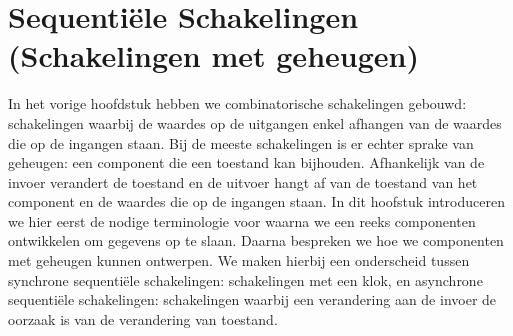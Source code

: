 \chapter{Sequenti\"ele Schakelingen (Schakelingen met geheugen)}
\begin{chapterintro}
In het vorige hoofdstuk hebben we combinatorische schakelingen gebouwd: schakelingen waarbij de waardes op de uitgangen enkel afhangen van de waardes die op de ingangen staan. Bij de meeste schakelingen is er echter sprake van geheugen: een component die een toestand kan bijhouden. Afhankelijk van de invoer verandert de toestand en de uitvoer hangt af van de toestand van het component en de waardes die op de ingangen staan. In dit hoofstuk introduceren we hier eerst de nodige terminologie voor waarna we een reeks componenten ontwikkelen om gegevens op te slaan. Daarna bespreken we hoe we componenten met geheugen kunnen ontwerpen. We maken hierbij een onderscheid tussen synchrone sequenti\"ele schakelingen: schakelingen met een klok, en asynchrone sequenti\"ele schakelingen: schakelingen waarbij een verandering aan de invoer de oorzaak is van de verandering van toestand.
\end{chapterintro}
\minitoc[n]

